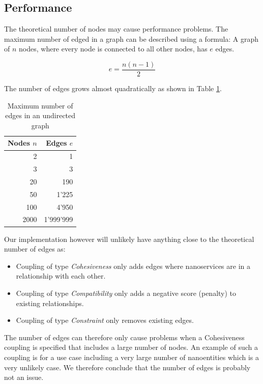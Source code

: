\subsection{Performance}


The theoretical number of nodes may cause performance problems. The maximum number of edged in a graph can be described using a formula: A graph of $n$ nodes, where every node is connected to all other nodes, has $e$ edges.

\begin{displaymath}
e = \frac{n(n-1)}{2}
\end{displaymath}

The number of edges grows almost quadratically as shown in Table \ref{tab:edgesCount}.

\begin{table}[H]
	\centering
	\caption{Maximum number of edges in an undirected graph}
	\label{tab:edgesCount}
	\begin{tabular}{|r|r|}
		\hline \textbf{Nodes} $n$ & \textbf{Edges} $e$ \\ 
		\hline 2 & 1 \\ 
		\hline 3 & 3 \\ 
		\hline 20 & 190 \\ 
		\hline 50 & 1'225 \\ 
		\hline 100 & 4'950 \\ 
		\hline 2000 & 1'999'999 \\ 
		\hline 
	\end{tabular} 
\end{table}

Our implementation however will unlikely have anything close to the theoretical number of edges as:
\begin{itemize}
	\item Coupling of type \textit{Cohesiveness} only adds edges where nanoservices are in a relationship with each other.
	\item Coupling of type \textit{Compatibility} only adds a negative score (penalty) to existing relationships.
	\item Coupling of type \textit{Constraint} only removes existing edges.
\end{itemize}

The number of edges can therefore only cause problems when a Cohesiveness coupling is specified that includes a large number of nodes. An example of such a coupling is for a use case including a very large number of nanoentities which is a very unlikely case. We therefore conclude that the number of edges is probably not an issue.


